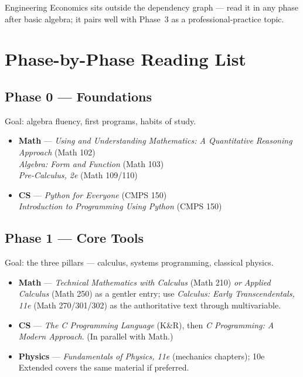 \documentclass[11pt]{article}
\newcommand{\track}[2]{\textcolor{#1}{\textbf{#2}}}
\newcommand{\book}[1]{\textit{#1}}
\begin{document}
\medskip
\noindent Engineering Economics sits outside the dependency graph --- read it
in any phase after basic algebra; it pairs well with Phase~3 as a
professional-practice topic.

\newpage
\section{Phase-by-Phase Reading List}

\subsection*{Phase 0 --- Foundations}
Goal: algebra fluency, first programs, habits of study.
\begin{itemize}[leftmargin=1.2em, itemsep=2pt]
  \item \track{mathcol}{Math} --- \book{Using and Understanding Mathematics:
        A Quantitative Reasoning Approach} (Math 102) \\
        \book{Algebra: Form and Function} (Math 103) \\
        \book{Pre-Calculus, 2e} (Math 109/110)
  \item \track{cscol}{CS} --- \book{Python for Everyone} (CMPS 150) \\
        \book{Introduction to Programming Using Python} (CMPS 150)
\end{itemize}

\subsection*{Phase 1 --- Core Tools}
Goal: the three pillars --- calculus, systems programming, classical physics.
\begin{itemize}[leftmargin=1.2em, itemsep=2pt]
  \item \track{mathcol}{Math} --- \book{Technical Mathematics with Calculus}
        (Math 210) \emph{or} \book{Applied Calculus} (Math 250) as a gentler
        entry; use \book{Calculus: Early Transcendentals, 11e} (Math 270/301/302)
        as the authoritative text through multivariable.
  \item \track{cscol}{CS} --- \book{The C Programming Language} (K\&R), then
        \book{C Programming: A Modern Approach}. (In parallel with Math.)
  \item \track{phycol}{Physics} --- \book{Fundamentals of Physics, 11e}
        (mechanics chapters); 10e Extended covers the same material if preferred.
\end{itemize}
\end{document}
